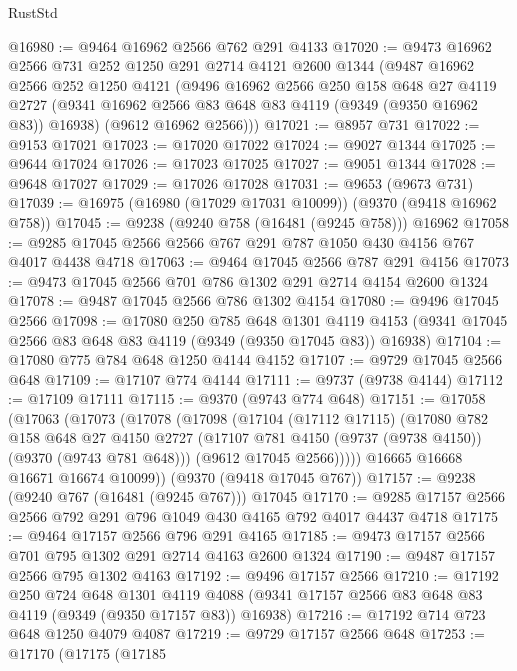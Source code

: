 \begin{lexlean}{RustStd}
\begin{coremodule}
{\begin{coremodule}
{{{{{{{{{{{{{{{{{{{{{{{{{{{{{{{{{{{{{{{@16980 := @9464 @16962 @2566 @762 @291 @4133
@17020 := @9473
    @16962
    @2566
    @731
    @252
    @1250
    @291
    @2714
    @4121
    @2600
    @1344
    (@9487
      @16962
      @2566
      @252
      @1250
      @4121
      (@9496
        @16962
        @2566
        @250
        @158
        @648
        @27
        @4119
        @2727
        (@9341 @16962 @2566 @83 @648 @83 @4119 (@9349 (@9350 @16962 @83)) @16938)
        (@9612 @16962 @2566)))
@17021 := @8957 @731
@17022 := @9153 @17021
@17023 := @17020 @17022
@17024 := @9027 @1344
@17025 := @9644 @17024
@17026 := @17023 @17025
@17027 := @9051 @1344
@17028 := @9648 @17027
@17029 := @17026 @17028
@17031 := @9653 (@9673 @731)
@17039 := @16975 (@16980 (@17029 @17031 @10099)) (@9370 (@9418 @16962 @758))
@17045 := @9238 (@9240 @758 (@16481 (@9245 @758))) @16962
@17058 := @9285 @17045 @2566 @2566 @767 @291 @787 @1050 @430 @4156 @767 @4017 @4438 @4718
@17063 := @9464 @17045 @2566 @787 @291 @4156
@17073 := @9473 @17045 @2566 @701 @786 @1302 @291 @2714 @4154 @2600 @1324
@17078 := @9487 @17045 @2566 @786 @1302 @4154
@17080 := @9496 @17045 @2566
@17098 := @17080
    @250
    @785
    @648
    @1301
    @4119
    @4153
    (@9341 @17045 @2566 @83 @648 @83 @4119 (@9349 (@9350 @17045 @83)) @16938)
@17104 := @17080 @775 @784 @648 @1250 @4144 @4152
@17107 := @9729 @17045 @2566 @648
@17109 := @17107 @774 @4144
@17111 := @9737 (@9738 @4144)
@17112 := @17109 @17111
@17115 := @9370 (@9743 @774 @648)
@17151 := @17058
    (@17063
      (@17073
        (@17078
          (@17098
            (@17104
              (@17112 @17115)
              (@17080
                @782
                @158
                @648
                @27
                @4150
                @2727
                (@17107 @781 @4150 (@9737 (@9738 @4150)) (@9370 (@9743 @781 @648)))
                (@9612 @17045 @2566)))))
        @16665
        @16668
        @16671
        @16674
        @10099))
    (@9370 (@9418 @17045 @767))
@17157 := @9238 (@9240 @767 (@16481 (@9245 @767))) @17045
@17170 := @9285 @17157 @2566 @2566 @792 @291 @796 @1049 @430 @4165 @792 @4017 @4437 @4718
@17175 := @9464 @17157 @2566 @796 @291 @4165
@17185 := @9473 @17157 @2566 @701 @795 @1302 @291 @2714 @4163 @2600 @1324
@17190 := @9487 @17157 @2566 @795 @1302 @4163
@17192 := @9496 @17157 @2566
@17210 := @17192
    @250
    @724
    @648
    @1301
    @4119
    @4088
    (@9341 @17157 @2566 @83 @648 @83 @4119 (@9349 (@9350 @17157 @83)) @16938)
@17216 := @17192 @714 @723 @648 @1250 @4079 @4087
@17219 := @9729 @17157 @2566 @648
@17253 := @17170
    (@17175
      (@17185
}}}}}}}}}}}}}}}}}}}}}}}}}}}}}}}}}}}}}}}
\end{coremodule}}
\end{coremodule}
\end{lexlean}
